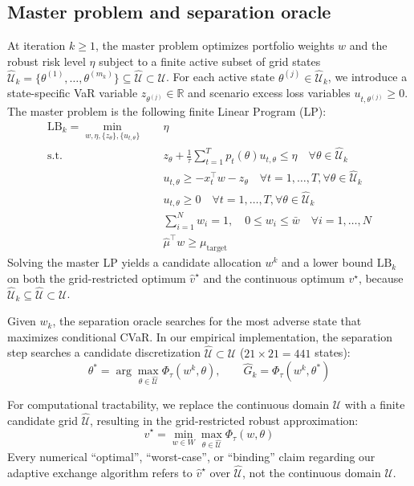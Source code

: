 \documentclass[smallextended]{svjour3}
\begin{document}
\subsection{Master problem and separation oracle}
At iteration $k \ge 1$, the master problem optimizes portfolio weights $w$ and the robust risk level $\eta$ subject to a finite active subset of grid states $\widehat{\mathcal{U}}_k = \{\theta^{(1)}, \dots, \theta^{(m_k)}\} \subseteq \widehat{\mathcal{U}} \subset \mathcal{U}$. For each active state $\theta^{(j)} \in \widehat{\mathcal{U}}_k$, we introduce a state-specific VaR variable $z_{\theta^{(j)}} \in \mathbb{R}$ and scenario excess loss variables $u_{t, \theta^{(j)}} \ge 0$. The master problem is the following finite Linear Program (LP):
\begin{align}
    \mathrm{LB}_k = \min_{w, \eta, \{z_\theta\}, \{u_{t,\theta}\}} \quad & \eta \\
    \text{s.t.} \quad & z_\theta + \frac{1}{\tau} \sum_{t=1}^{T} p_t(\theta) u_{t,\theta} \le \eta \quad \forall \theta \in \widehat{\mathcal{U}}_k \\
    & u_{t,\theta} \ge -x_t^\top w - z_\theta \quad \forall t=1,\dots,T, \forall \theta \in \widehat{\mathcal{U}}_k \\
    & u_{t,\theta} \ge 0 \quad \forall t=1,\dots,T, \forall \theta \in \widehat{\mathcal{U}}_k \\
    & \sum_{i=1}^N w_i = 1, \quad 0 \le w_i \le \bar{w} \quad \forall i=1,\dots,N \\
    & \hat{\mu}^\top w \ge \mu_{\text{target}}
\end{align}
Solving the master LP yields a candidate allocation $w^k$ and a lower bound $\mathrm{LB}_k$ on both the grid-restricted optimum $\widehat v^\star$ and the continuous optimum $v^\star$, because $\widehat{\mathcal{U}}_k\subseteq\widehat{\mathcal{U}}\subset\mathcal{U}$.

Given $w_k$, the separation oracle searches for the most adverse state that maximizes conditional CVaR. In our empirical implementation, the separation step searches a candidate discretization $\widehat{\mathcal{U}} \subset \mathcal{U}$ ($21\times21 = 441$ states):
\begin{equation}
    \theta^* = \arg\max_{\theta \in \widehat{\mathcal{U}}} \Phi_\tau(w^k, \theta), \qquad \widehat{G}_k = \Phi_\tau(w^k, \theta^*)
\end{equation}

For computational tractability, we replace the continuous domain $\mathcal{U}$ with a finite candidate grid $\widehat{\mathcal{U}}$, resulting in the grid-restricted robust approximation:
\begin{equation}
    \widehat{v}^\star = \min_{w \in W} \max_{\theta \in \widehat{\mathcal{U}}} \Phi_\tau(w, \theta)
\end{equation}
Every numerical ``optimal'', ``worst-case'', or ``binding'' claim regarding our adaptive exchange algorithm refers to $\widehat{v}^\star$ over $\widehat{\mathcal{U}}$, not the continuous domain $\mathcal{U}$.
\end{document}
